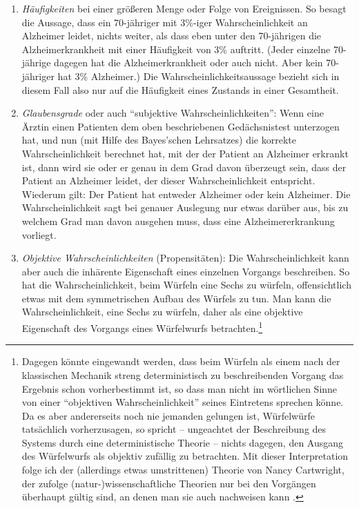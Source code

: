 \begin{enumerate}
  \item {\em Häufigkeiten} bei einer größeren Menge oder Folge von Ereignissen.
  So besagt die Aussage, dass ein 70-jähriger mit 3\%-iger Wahrscheinlichkeit an
  Alzheimer leidet, nichts weiter, als dass eben unter den 70-jährigen die
  Alzheimerkrankheit mit einer Häufigkeit von 3\% auftritt. (Jeder einzelne
  70-jährige dagegen hat die Alzheimerkrankheit oder auch nicht. Aber kein
  70-jähriger hat 3\% Alzheimer.) Die Wahrscheinlichkeitsaussage bezieht sich
  in diesem Fall also nur auf die Häufigkeit eines Zustands in einer
  Gesamtheit.
  \item {\em Glaubensgrade} oder auch "`subjektive Wahrscheinlichkeiten"': Wenn
  eine Ärztin einen Patienten dem oben beschriebenen Gedächsnistest unterzogen hat, 
  und nun (mit Hilfe des
  Bayes'schen Lehrsatzes) die korrekte Wahrscheinlichkeit berechnet hat, mit der
  der Patient an Alzheimer erkrankt ist, dann wird sie oder er genau in dem Grad
  davon überzeugt sein, dass der Patient an Alzheimer leidet, der dieser
  Wahrscheinlichkeit entspricht. Wiederum gilt: Der Patient hat entweder Alzheimer oder kein
  Alzheimer. Die Wahrscheinlichkeit sagt bei genauer Auslegung nur etwas
  darüber aus, bis zu welchem Grad man davon ausgehen muss, dass eine
  Alzheimererkrankung vorliegt. 
  \item {\em Objektive Wahrscheinlichkeiten} (Propensitäten): Die
  Wahrscheinlichkeit kann aber auch die inhärente Eigenschaft eines einzelnen 
  Vorgangs beschreiben. So hat
  die Wahrscheinlichkeit, beim Würfeln eine Sechs zu würfeln, offensichtlich
  etwas mit dem symmetrischen Aufbau des Würfels zu tun. Man kann die
  Wahrscheinlichkeit, eine Sechs zu würfeln, daher als eine objektive
  Eigenschaft des Vorgangs eines Würfelwurfs betrachten.\footnote{Dagegen
  könnte eingewandt werden, dass beim Würfeln als einem nach der klassischen
  Mechanik streng deterministisch zu beschreibenden Vorgang das Ergebnis
  schon vorherbestimmt ist, so dass man nicht im wörtlichen Sinne von einer
  "`objektiven Wahrscheinlichkeit"' seines Eintretens sprechen könne. Da
  es aber andererseits noch nie jemanden gelungen ist, Würfelwürfe tatsächlich 
 vorherzusagen, so spricht -- ungeachtet der Beschreibung des Systems durch
 eine deterministische Theorie -- nichts dagegen, den Ausgang des Würfelwurfs
 als objektiv zufällig zu betrachten. Mit dieser Interpretation folge ich der
 (allerdings etwas umstrittenen) Theorie von Nancy Cartwright, der zufolge
 (natur-)wissenschaftliche Theorien nur bei den Vorgängen überhaupt gültig
 sind, an denen man sie auch nachweisen kann \cite[]{cartwright:1999}. }
\end{enumerate}

